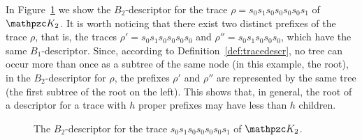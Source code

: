 \begin{example}
In Figure~\ref{removeisom} we show the $B_2$-descriptor for the trace $\rho = s_0s_1s_0s_0s_0s_0s_1$ of $\Ku_{2}$. It is worth noticing that there exist two distinct prefixes of the trace $\rho$, that is, the traces $\rho'=s_0s_1s_0s_0s_0s_0$ and $\rho''=s_0s_1s_0s_0s_0$, which have the same $B_1$-descriptor. Since, according to Definition~\ref{def:tracedescr}, no tree can occur more than once as a subtree of the same node (in this example, the root), in the $B_2$-descriptor for $\rho$, the prefixes $\rho'$ and $\rho''$ are represented by the same tree (the first subtree of the root on the left). This shows that, in general, the root of a descriptor for a trace with $h$ proper prefixes may have less than $h$ children.

\begin{figure}[H] 
\centering
\resizebox{\textwidth}{!}{
\begin{tikzpicture}[level distance=15mm,every node/.style={fill=gray!20}]
\Tree [.$(s_0,\{s_0,s_1\},s_1)$
	[.$(s_0,\{s_0,s_1\},s_0)$
		$(s_0,\{s_0,s_1\},s_0)$
		$(s_0,\{s_1\},s_0)$
		$(s_0,\emptyset,s_1)$
]	[.$(s_0,\{s_0,s_1\},s_0)$
		$(s_0,\{s_1\},s_0)$
		$(s_0,\emptyset,s_1)$
]	[.$(s_0,\{s_1\},s_0)$
		$(s_0,\emptyset,s_1)$
]	$(s_0,\emptyset,s_1)$
]
\end{tikzpicture}}
\caption{The $B_2$-descriptor for the trace $s_0s_1s_0s_0s_0s_0s_1$ of $\Ku_{2}$.}\label{removeisom}
\end{figure}
\end{example}

